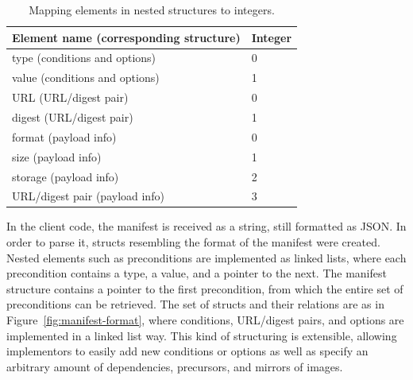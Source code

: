 \documentclass[0-thesis.tex]{subfiles}
\begin{document}
\begin{longtable}[]{@{}ll@{}}
    \caption{Mapping elements in nested structures to integers.}
    \label{tab:nested-substitution}\\
    \toprule
    Element name (corresponding structure) & Integer\tabularnewline
    \midrule
    \endhead
    type (conditions and options) & 0\tabularnewline
    value (conditions and options) & 1\tabularnewline
    \bottomrule
    URL (URL/digest pair) & 0\tabularnewline
    digest (URL/digest pair) & 1\tabularnewline
    \bottomrule
    format (payload info) & 0\tabularnewline
    size (payload info) & 1\tabularnewline
    storage (payload info) & 2\tabularnewline
    URL/digest pair (payload info) & 3\tabularnewline
    \bottomrule
\end{longtable}

In the client code, the manifest is received as a string, still formatted as JSON. In
order to parse it, structs resembling the format of the manifest were created. Nested
elements such as preconditions are implemented as linked lists, where each precondition
contains a type, a value, and a pointer to the next. The manifest structure contains a
pointer to the first precondition, from which the entire set of preconditions can be
retrieved. The set of structs and their relations are as in
Figure~\ref{fig:manifest-format}, where conditions, URL/digest pairs, and options are
implemented in a linked list way. This kind of structuring is extensible, allowing
implementors to easily add new conditions or options as well as specify an arbitrary
amount of dependencies, precursors, and mirrors of images.
\end{document}
